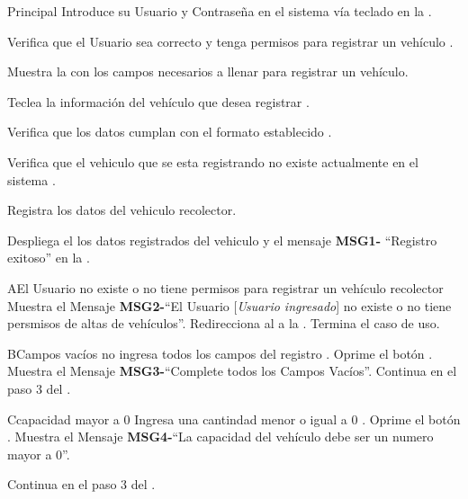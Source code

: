 \begin{UCtrayectoria}{Principal}
	\UCpaso[\UCactor] Introduce su Usuario  y Contraseña en el sistema vía teclado en la  .
	
	\UCpaso Verifica que el Usuario sea correcto y tenga permisos para registrar un vehículo  .
	
	\UCpaso Muestra la  con los campos necesarios a llenar para registrar un vehículo.
	
	\UCpaso[\UCactor] Teclea la información del vehículo que desea registrar  \label{CU17SeleccionarSeminario}.
	
	\UCpaso Verifica que  los datos cumplan con el formato establecido  .
	
	
	\UCpaso Verifica que el vehiculo que se esta registrando no existe actualmente en el sistema  .
	
	\UCpaso Registra los datos del vehiculo recolector.
	
	\UCpaso Despliega el los datos registrados del vehiculo y  el mensaje
	 {\bf MSG1-} ``Registro exitoso'' en la .
	
	
\end{UCtrayectoria}
	
\begin{UCtrayectoriaA}{A}{El Usuario no existe o no tiene permisos para registrar  un vehículo recolector}
	\UCpaso Muestra el Mensaje {\bf MSG2-}``El Usuario  [{\em Usuario ingresado}] no existe o no tiene persmisos de altas de vehículos''.
	\UCpaso Redirecciona al \UCactor a la    .
	\UCpaso[] Termina el caso de uso.
\end{UCtrayectoriaA}

	\begin{UCtrayectoriaA}{B}{Campos vacíos}
	\UCpaso [\UCactor] no ingresa  todos los campos del registro .
	\UCpaso[\UCactor] Oprime el botón .
	\UCpaso Muestra el Mensaje {\bf MSG3-}``Complete todos  los Campos Vacíos''.
	\UCpaso Continua en el paso 3 del .
\end{UCtrayectoriaA}

\begin{UCtrayectoriaA}{C}{capacidad mayor a 0}
	\UCpaso [\UCactor] Ingresa una cantindad menor o igual a 0 .
	\UCpaso[\UCactor] Oprime el botón .
	\UCpaso Muestra el Mensaje {\bf MSG4-}``La capacidad del vehículo debe ser un numero mayor a 0''.

	\UCpaso Continua en el paso 3 del .
\end{UCtrayectoriaA}


